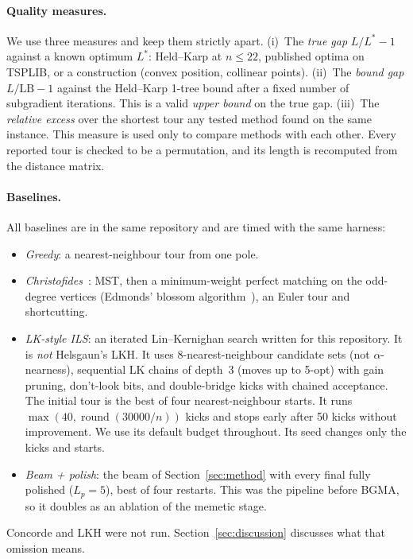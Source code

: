 \paragraph{Quality measures.}
We use three measures and keep them strictly apart.
(i)~The \emph{true gap} $L/L^\ast-1$ against a known optimum $L^\ast$: Held--Karp at $n\le 22$,
published optima on TSPLIB, or a construction (convex position, collinear points).
(ii)~The \emph{bound gap} $L/\mathrm{LB}-1$ against the Held--Karp 1-tree bound after a fixed number
of subgradient iterations. This is a valid \emph{upper bound} on the true gap.
(iii)~The \emph{relative excess} over the shortest tour any tested method found on the same instance.
This measure is used only to compare methods with each other. Every reported tour is checked to be a
permutation, and its length is recomputed from the distance matrix.

\paragraph{Baselines.}
All baselines are in the same repository and are timed with the same harness:
\begin{itemize}\itemsep0pt
\item \emph{Greedy}: a nearest-neighbour tour from one pole.
\item \emph{Christofides}~\citep{christofides1976}: MST, then a minimum-weight perfect matching on
the odd-degree vertices (Edmonds' blossom algorithm~\citep{edmonds1965}), an Euler tour and
shortcutting.
\item \emph{LK-style ILS}: an iterated Lin--Kernighan search written for this repository. It is
\emph{not} Helsgaun's LKH. It uses 8-nearest-neighbour candidate sets (not $\alpha$-nearness),
sequential LK chains of depth~3 (moves up to 5-opt) with gain pruning, don't-look bits, and
double-bridge kicks with chained acceptance. The initial tour is the best of four nearest-neighbour
starts. It runs $\max(40,\operatorname{round}(30000/n))$ kicks and stops early after 50 kicks
without improvement. We use its default budget throughout. Its seed changes only the kicks and
starts.
\item \emph{Beam + polish}: the beam of Section~\ref{sec:method} with every final fully polished
($L_p=5$), best of four restarts. This was the pipeline before BGMA, so it doubles as an ablation of
the memetic stage.
\end{itemize}
Concorde and LKH were not run. Section~\ref{sec:discussion} discusses what that omission means.
